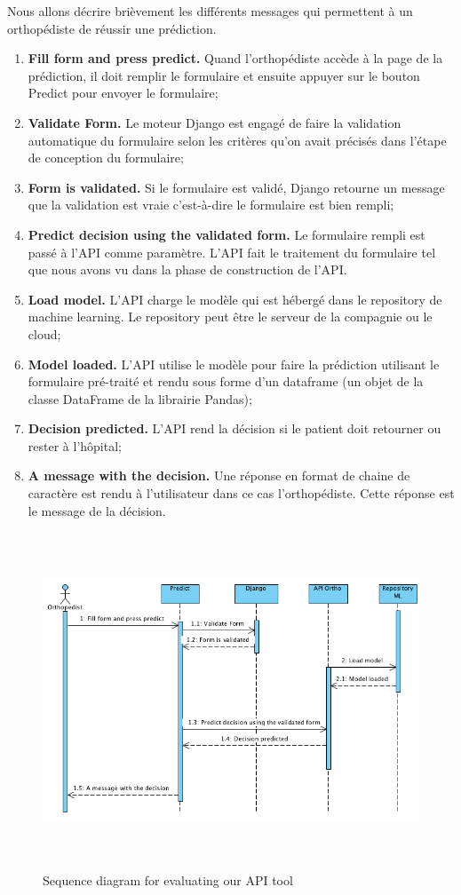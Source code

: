 \documentclass[12pt, french]{report}
\begin{document}
Nous allons décrire brièvement les différents messages qui permettent à un orthopédiste de réussir une prédiction.
\begin{enumerate}
\item \textbf{Fill form and press predict.} Quand l'orthopédiste accède à la page de la prédiction, il doit remplir le formulaire et ensuite appuyer sur le bouton Predict pour envoyer le formulaire;
\item \textbf{Validate Form.} Le moteur Django est engagé de faire la validation automatique du formulaire selon les critères qu'on avait précisés dans l'étape de conception du formulaire;
\item \textbf{Form is validated.} Si le formulaire est validé, Django retourne un message que la validation est vraie c'est-à-dire le formulaire est bien rempli;
\item \textbf{Predict decision using the validated form.} Le formulaire rempli est passé à l'API comme paramètre. L'API fait le traitement du formulaire tel que nous avons vu dans la phase de construction de l'API.
\item \textbf{Load model.} L'API charge le modèle qui est hébergé dans le repository de machine learning. Le repository peut être le serveur de la compagnie ou le cloud;
\item \textbf{Model loaded.} L'API utilise le modèle pour faire la prédiction utilisant le formulaire pré-traité et rendu sous forme d'un dataframe (un objet de la classe DataFrame de la librairie Pandas);
\item \textbf{Decision predicted.} L'API rend la décision si le patient doit retourner ou rester à l'hôpital;
\item \textbf{A message with the decision.} Une réponse en format de chaine de caractère est rendu à l'utilisateur dans ce cas l'orthopédiste. Cette réponse est le message de la décision.
\end{enumerate}


 
\begin{figure}[p]
	\includegraphics[width=17cm, height=10cm ]{images/SequenceDiag.png}
	\caption{Sequence diagram for evaluating our API tool}
	\label{SequenceDiag}
\end{figure} 
\end{document}
